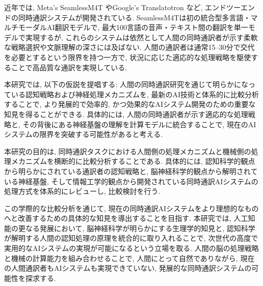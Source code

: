 近年では, Meta's SeamlessM4T \cite{barrault2023seamlessm4t} やGoogle's Translatotron \cite{jia2019direct} など, エンドツーエンドの同時通訳システムが開発されている. 
SeamlessM4Tは初の統合型多言語・マルチモーダルAI翻訳モデルで, 最大100言語の音声・テキスト間の翻訳を単一モデルで実現するが, これらのシステムは依然として人間の同時通訳者が示す柔軟な戦略選択や文脈理解の深さには及ばない. 
人間の通訳者は通常15--30分で交代を必要とするという限界を持つ一方で, 状況に応じた適応的な処理戦略を駆使することで高品質な通訳を実現している. 

本研究では, 以下の仮説を提唱する: 人間の同時通訳研究を通じて明らかになっている認知戦略および神経処理メカニズムを, 最新のAI技術と体系的に比較分析することで, より発展的で効率的, かつ効果的なAIシステム開発のための重要な知見を得ることができる. 
具体的には, 人間の同時通訳者が示す適応的な処理戦略と, その背後にある神経基盤の理解を計算モデルに統合することで, 現在のAIシステムの限界を突破する可能性があると考える. 

本研究の目的は, 同時通訳タスクにおける人間側の処理メカニズムと機械側の処理メカニズムを横断的に比較分析することである. 
具体的には, 認知科学的観点から明らかにされている通訳者の認知戦略と, 脳神経科学的観点から解明されている神経基盤, そして情報工学的観点から開発されている同時通訳AIシステムの処理方式を体系的にレビューし, 比較検討を行う. 

この学際的な比較分析を通じて, 現在の同時通訳AIシステムをより理想的なものへと改善するための具体的な知見を導出することを目指す. 
本研究では, 人工知能の更なる発展において, 脳神経科学が明らかにする生理学的知見と, 認知科学が解明する人間の認知処理の原理を統合的に取り入れることで, 次世代の高度で実用的なAIシステムの実現が可能になるという立場を取る. 
人間の脳の処理戦略と機械の計算能力を組み合わせることで, 人間にとって自然でありながら, 現在の人間通訳者もAIシステムも実現できていない, 発展的な同時通訳システムの可能性を探求する. 